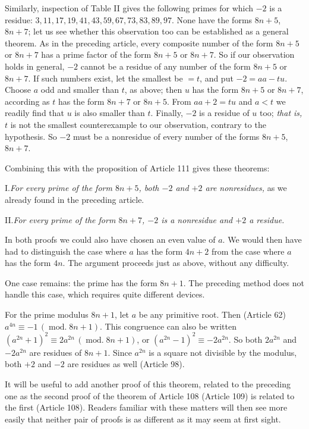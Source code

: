 Similarly, inspection of Table II gives the following primes for which $-2$ is a residue: $3,11,17,19,41,43,59,67,73,83,89,97$. None have the forms $8n+5$, $8n+7$; let us see whether this observation too can be established as a general theorem. As in the preceding article, every composite number of the form $8n+5$ or $8n+7$ has a prime factor of the form $8n+5$ or $8n+7$. So if our observation holds in general, $-2$ cannot be a residue of any number of the form $8n+5$ or $8n+7$. If such numbers exist, let the smallest be $=t$, and put $-2=aa-tu$. Choose $a$ odd and smaller than $t$, as above; then $u$ has the form $8n+5$ or $8n+7$, according as $t$ has the form $8n+7$ or $8n+5$. From $aa+2=tu$ and $a<t$ we readily find that $u$ is also smaller than $t$. Finally, $-2$ is a residue of $u$ too; \emph{that is,} $t$ is not the smallest counterexample to our observation, contrary to the hypothesis. So $-2$ must be a nonresidue of every number of the forms $8n+5$, $8n+7$.

Combining this with the proposition of Article 111 gives these theorems:

I.\quad \emph{For every prime of the form $8n+5$, both $-2$ and $+2$ are nonresidues,} as we already found in the preceding article.

II.\quad \emph{For every prime of the form $8n+7$, $-2$ is a nonresidue and $+2$ a residue.}

In both proofs we could also have chosen an even value of $a$. We would then have had to distinguish the case where $a$ has the form $4n+2$ from the case where $a$ has the form $4n$. The argument proceeds just as above, without any difficulty.

One case remains: the prime has the form $8n+1$. The preceding method does not handle this case, which requires quite different devices.

For the prime modulus $8n+1$, let $a$ be any primitive root. Then (Article 62) $a^{4n}\equiv-1\,(\operatorname{mod.}8n+1)$. This congruence can also be written $(a^{2n}+1)^2\equiv2a^{2n}\,(\operatorname{mod.}8n+1)$, or $(a^{2n}-1)^2\equiv-2a^{2n}$. So both $2a^{2n}$ and $-2a^{2n}$ are residues of $8n+1$. Since $a^{2n}$ is a square not divisible by the modulus, both $+2$ and $-2$ are residues as well (Article 98).

It will be useful to add another proof of this theorem, related to the preceding one as the second proof of the theorem of Article 108 (Article 109) is related to the first (Article 108). Readers familiar with these matters will then see more easily that neither pair of proofs is as different as it may seem at first sight.

